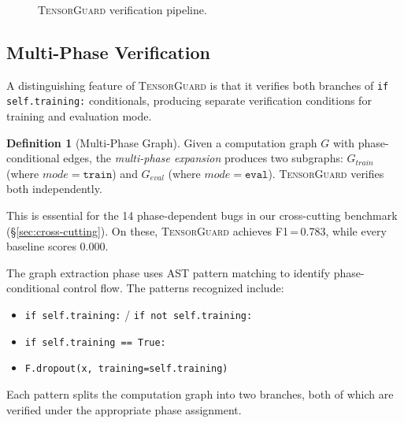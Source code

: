 \documentclass[10pt]{article}
\newcommand{\tguard}{\textsc{TensorGuard}}
\newcommand{\Tprod}{\mathcal{T}_{\Pi}}
\theoremstyle{plain}
\theoremstyle{definition}
\newtheorem{definition}[theorem]{Definition}
\theoremstyle{remark}
\begin{document}
\begin{figure}[t]
\centering
{}
\caption{\tguard{} verification pipeline.}
\label{fig:pipeline}
\end{figure}


\subsection{Multi-Phase Verification}\label{sec:multiphase}

A distinguishing feature of \tguard{} is that it verifies both
branches of \texttt{if self.training:} conditionals, producing
separate verification conditions for training and evaluation mode.

\begin{definition}[Multi-Phase Graph]
Given a computation graph $G$ with phase-conditional edges, the
\emph{multi-phase expansion} produces two subgraphs:
$G_{\mathit{train}}$ (where $\mathit{mode} = \texttt{train}$) and
$G_{\mathit{eval}}$ (where $\mathit{mode} = \texttt{eval}$).
\tguard{} verifies both independently.
\end{definition}

This is essential for the 14 phase-dependent bugs in our
cross-cutting benchmark (\S\ref{sec:cross-cutting}).  On these,
\tguard{} achieves F1\,=\,0.783, while every baseline scores 0.000.

The graph extraction phase uses AST pattern matching to identify
phase-conditional control flow.  The patterns recognized include:
\begin{itemize}[nosep]
  \item \texttt{if self.training:} / \texttt{if not self.training:}
  \item \texttt{if self.training == True:}
  \item \texttt{F.dropout(x, training=self.training)}
\end{itemize}
Each pattern splits the computation graph into two branches, both of
which are verified under the appropriate phase assignment.
\end{document}
